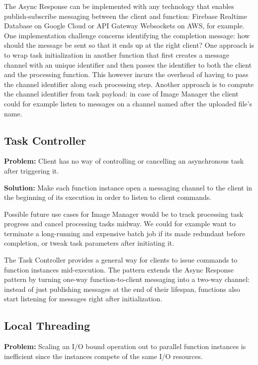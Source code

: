 The Async Response can be implemented with any technology that enables publish-subscribe messaging between the client and function: Firebase Realtime Database on Google Cloud or API Gateway Websockets on AWS, for example. One implementation challenge concerns identifying the completion message: how should the message be sent so that it ends up at the right client? One approach is to wrap task initialization in another function that first creates a message channel with an unique identifier and then passes the identifier to both the client and the processing function. This however incurs the overhead of having to pass the channel identifier along each processing step. Another approach is to compute the channel identifier from task payload: in case of Image Manager the client could for example listen to messages on a channel named after the uploaded file's name.

\subsection{Task Controller} \label{subsec:taskManager}

\textbf{Problem:} Client has no way of controlling or cancelling an asynchronous task after triggering it.


\textbf{Solution:} Make each function instance open a messaging channel to the client in the beginning of its execution in order to listen to client commands.

Possible future use cases for Image Manager would be to track processing task progress and cancel processing tasks midway. We could for example want to terminate a long-running and expensive batch job if its made redundant before completion, or tweak task parameters after initiating it.

The Task Controller provides a general way for clients to issue commands to function instances mid-execution. The pattern extends the Async Response pattern by turning one-way function-to-client messaging into a two-way channel: instead of just publishing messages at the end of their lifespan, functions also start listening for messages right after initialization.

\subsection{Local Threading} \label{subsec:LocalThreads}

\textbf{Problem:} Scaling an I/O bound operation out to parallel function instances is inefficient since the instances compete of the same I/O resources.

